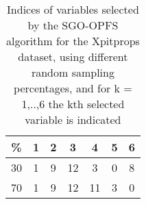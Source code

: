 \begin{table}
	\begin{center}
		\begin{tabular}{c c c c c c c}
			\% & 1 & 2 & 3 & 4 & 5 & 6 \\
			\hline
			30 & 1 & 9 & 12 & 3 & 0 & 8 \\
			70 & 1 & 9 & 12 & 11 & 3 & 0 \\
		\end{tabular}
	\end{center}
	\caption{Indices of variables selected by the SGO-OPFS algorithm for the Xpitprops dataset, using different random sampling percentages, and for k = 1,..,6 the kth selected variable is indicated}
\end{table}